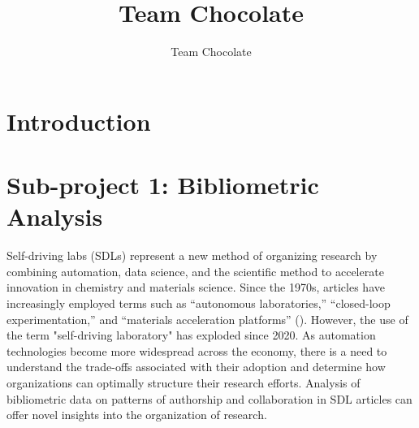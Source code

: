 \documentclass{article}
\title{Team Chocolate}
\author{Team Chocolate}
\begin{document}
\maketitle




\section{Introduction}

\section{Sub-project 1: Bibliometric Analysis}

Self-driving labs (SDLs) represent a new method of organizing research by combining automation, data science, and the scientific method to accelerate innovation in chemistry and materials science. Since the 1970s, articles have increasingly employed terms such as “autonomous laboratories,” “closed-loop experimentation,” and “materials acceleration platforms” (\cite{sterling2024}). However, the use of the term "self-driving laboratory" has exploded since 2020. As automation technologies become more widespread across the economy, there is a need to understand the trade-offs associated with their adoption and determine how organizations can optimally structure their research efforts. Analysis of bibliometric data on patterns of authorship and collaboration in SDL articles can offer novel insights into the organization of research.
\end{document}
